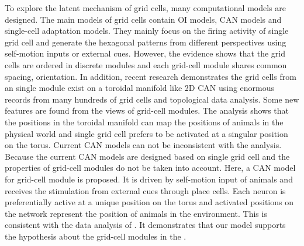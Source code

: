 \documentclass[final,5p,times,twocolumn,authoryear]{elsarticle}
\begin{document}
To explore the latent mechanism of grid cells, many computational models are designed. The main models of grid cells contain OI models\citep{OKeefe2005,Burgess2007,Hasselmo2007,Pastoll2013,Burgess2008}, CAN models\citep{Fuhs2006,Burak2009,Guanella2007,Shipston-Sharman2016,Couey2013} and single-cell adaptation models\citep{Kropff2008,Si2012}. They mainly focus on the firing activity of single grid cell and generate the hexagonal patterns from different perspectives using self-motion inputs or external cues. However, the evidence shows that the grid cells are ordered in discrete modules and each grid-cell module shares common spacing, orientation\citep{Stensola2012,Rowland2016}. In addition, recent research demonstrates the grid cells from an single module exist on a toroidal manifold like 2D CAN using enormous records from many hundreds of grid cells and topological data analysis\citep{Gardner2022}. Some new features are found from the views of grid-cell modules. The analysis shows that the positions in the toroidal manifold can map the positions of animals in the physical world and single grid cell prefers to be activated at a singular position on the torus\citep{Gardner2022}. Current CAN models\citep{Fuhs2006,Burak2009,Guanella2007} can not be inconsistent with the analysis. Because the current CAN models are designed based on single grid cell and the properties of grid-cell modules do not be taken into account. Here, a CAN model for grid-cell module is proposed. It is driven by self-motion input of animals and receives the stimulation from external cues through place cells. Each neuron is preferentially active at a unique position on the torus and activated positions on the network represent the position of animals in the environment. This is consistent with the data analysis of \citet{Gardner2022}.  It demonstrates that our model supports the hypothesis about the grid-cell modules in the \citet{Gardner2022}.






\end{document}
